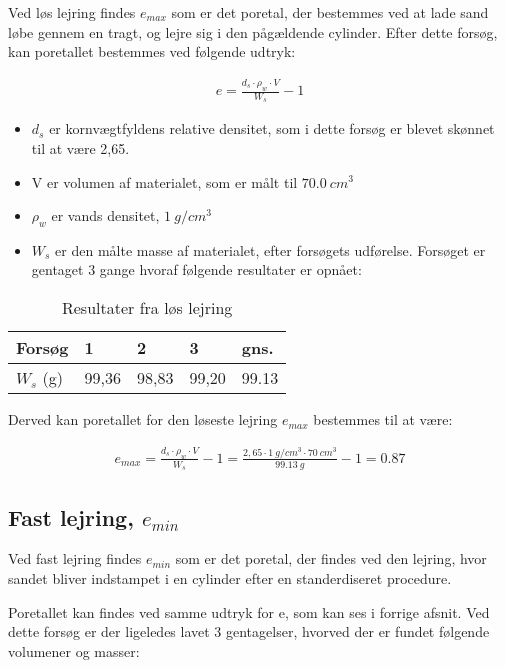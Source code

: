 Ved løs lejring findes $e_{max}$ som er det poretal, der bestemmes ved at lade sand løbe gennem en tragt, og  lejre sig i den pågældende cylinder.
Efter dette forsøg, kan poretallet bestemmes ved følgende udtryk:

\begin{align*}
e=\frac{d_{s}\cdot \rho_{w}\cdot V}{W_{s}}-1
\end{align*}

\begin{itemize}
\item $d_{s}$ er kornvægtfyldens relative densitet, som i dette forsøg er blevet skønnet til at være 2,65.
\item V er volumen af materialet, som er målt til $\SI{70,0}{cm^{3}}$
\item $\rho_{w}$ er vands densitet, $\SI{1}{g/cm^{3}}$
\item $W_{s}$ er den målte masse af materialet, efter forsøgets udførelse. Forsøget er gentaget 3 gange hvoraf følgende resultater er opnået:
\end{itemize}


\begin{table}[H]
\centering
\begin{tabular}{|l|l|l|l|l|}
\hline
Forsøg & 1     & 2     & 3     & gns.  \\ \hline
$W_{s}$ (g)    & 99,36 & 98,83 & 99,20 & 99.13 \\ \hline
\end{tabular}
\caption{Resultater fra løs lejring}
\label{my-label}
\end{table}

Derved kan poretallet for den løseste lejring $e_{max}$ bestemmes til at være:

\begin{align*}
e_{max}=\frac{d_{s}\cdot \rho_{w}\cdot V}{W_{s}}-1=\frac{2,65\cdot \SI{1}{g/cm^{3}} \cdot \SI{70}{cm^{3}}}{\SI{99,13}{g}}-1=0.87
\end{align*}




\subsection{Fast lejring, $e_{min}$}

Ved fast lejring findes $e_{min}$ som er det poretal, der findes ved den lejring, hvor sandet bliver indstampet i en cylinder efter en standerdiseret procedure.

Poretallet kan findes ved samme udtryk for e, som kan ses i forrige afsnit. Ved dette forsøg er der ligeledes lavet 3 gentagelser, hvorved der er fundet  følgende volumener og masser:

